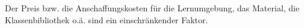 Der Preis bzw. die Anschaffungskosten für die Lernumgebung, das Material, die Klassenbibliothek o.ä. sind ein einschränkender Faktor.